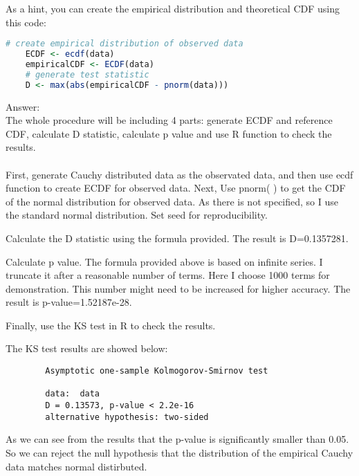 \documentclass[12pt,letterpaper]{article}
\begin{document}
	
\noindent As a hint, you can create the empirical distribution and theoretical CDF using this code:

\begin{lstlisting}[language=R]
	# create empirical distribution of observed data
	ECDF <- ecdf(data)
	empiricalCDF <- ECDF(data)
	# generate test statistic
	D <- max(abs(empiricalCDF - pnorm(data))) \end{lstlisting}

\noindent Answer:\\
\noindent The whole procedure will be including 4 parts: generate ECDF and reference CDF, calculate D statistic, calculate p value and use R function to check the results.\\\\First, generate Cauchy distributed data as the observated data, and then use ecdf function to create ECDF for observed data. Next, Use pnorm( ) to get the CDF of the normal distribution for observed data. As there is not specified, so I use the standard normal distribution. Set seed for reproducibility.

		
		
\noindent Calculate the D statistic using the formula provided. The result is D=0.1357281.
		
		
		
\noindent Calculate p value. The formula provided above is based on infinite series. I truncate it after a reasonable number of terms. Here I choose 1000 terms for demonstration. This number might need to be increased for higher accuracy. The result is p-value=1.52187e-28.

		

\noindent Finally, use the KS test in R to check the results.

		

\noindent The KS test results are showed below:
\begin{verbatim}
		Asymptotic one-sample Kolmogorov-Smirnov test
		
		data:  data
		D = 0.13573, p-value < 2.2e-16
		alternative hypothesis: two-sided
\end{verbatim}

\noindent As we can see from the results that the p-value is significantly smaller than 0.05. So we can reject the null hypothesis that the distribution of the empirical Cauchy data matches normal distirbuted.
\vspace{.5cm}
\end{document}
